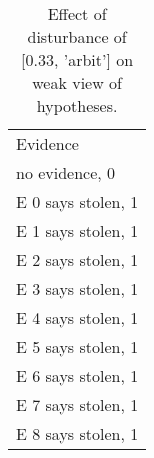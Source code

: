 \begin{table}\begin{tabular}{l}\toprule\multirow{2}{*}{Evidence} \\\\\midrule
no evidence, 0 & \\E 0 says stolen, 1 & \\E 1 says stolen, 1 & \\E 2 says stolen, 1 & \\E 3 says stolen, 1 & \\E 4 says stolen, 1 & \\E 5 says stolen, 1 & \\E 6 says stolen, 1 & \\E 7 says stolen, 1 & \\E 8 says stolen, 1 & \\\bottomrule\end{tabular}\caption{Effect of disturbance of [0.33, 'arbit'] on weak view of hypotheses.}\end{table}